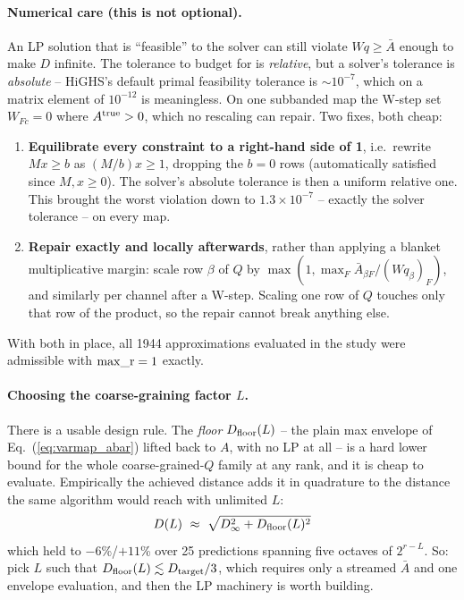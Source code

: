 \documentclass{article}
\numberwithin{equation}{section}   %
\begin{document}
\paragraph*{Numerical care (this is not optional).}
An LP solution that is ``feasible'' to the solver can still violate $W q \ge \bar A$ enough to
make $D$ infinite. The tolerance to budget for is {\em relative}, but a solver's tolerance is
{\em absolute} -- HiGHS's default primal feasibility tolerance is $\sim\!10^{-7}$, which on a
matrix element of $10^{-12}$ is meaningless. On one subbanded map the W-step set $W_{Fc} = 0$
where $A^{\rm true} > 0$, which no rescaling can repair. Two fixes, both cheap:
\begin{enumerate}
\item {\bf Equilibrate every constraint to a right-hand side of 1}, i.e.\ rewrite $Mx \ge b$ as
 $(M/b)x \ge 1$, dropping the $b=0$ rows (automatically satisfied since $M, x \ge 0$). The
 solver's absolute tolerance is then a uniform relative one. This brought the worst violation
 down to $1.3\times10^{-7}$ -- exactly the solver tolerance -- on every map.
\item {\bf Repair exactly and locally afterwards}, rather than applying a blanket multiplicative
 margin: scale row $\beta$ of $Q$ by $\max(1, \max_F \bar A_{\beta F}/(Wq_\beta)_F)$, and
 similarly per channel after a W-step. Scaling one row of $Q$ touches only that row of the
 product, so the repair cannot break anything else.
\end{enumerate}
With both in place, all 1944 approximations evaluated in the study were admissible with
${\rm max\_r} = 1$ exactly.

\paragraph*{Choosing the coarse-graining factor $L$.}
There is a usable design rule. The {\em floor} $D_{\rm floor}(L)$ -- the plain max envelope of
Eq.\ (\ref{eq:varmap_abar}) lifted back to $A$, with no LP at all -- is a hard lower bound for
the whole coarse-grained-$Q$ family at any rank, and it is cheap to evaluate. Empirically the
achieved distance adds it in quadrature to the distance the same algorithm would reach with
unlimited $L$:
\begin{equation}
D(L) \ \approx \ \sqrt{D_\infty^2 + D_{\rm floor}(L)^2}
\label{eq:varmap_quadrature}
\end{equation}
which held to $-6$\%/$+11$\% over 25 predictions spanning five octaves of $2^{r-L}$. So: pick $L$
such that $D_{\rm floor}(L) \lesssim D_{\rm target}/3$, which requires only a streamed $\bar A$
and one envelope evaluation, and then the LP machinery is worth building.
\end{document}

